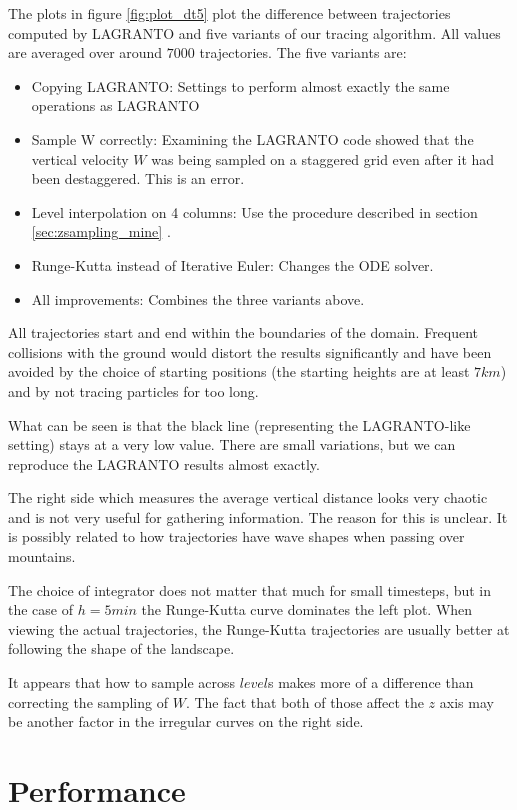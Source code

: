 The plots in figure \ref{fig:plot_dt5} plot the difference between trajectories computed by LAGRANTO and five variants of our tracing algorithm. All values are averaged over around $7000$ trajectories. The five variants are:
\begin{itemize}
\item Copying LAGRANTO: Settings to perform almost exactly the same operations as LAGRANTO
\item Sample W correctly: Examining the LAGRANTO code showed that the vertical velocity $W$ was being sampled on a staggered grid even after it had been destaggered. This is an error.
\item Level interpolation on 4 columns: Use the procedure described in section \ref{sec:zsampling_mine} .
\item Runge-Kutta instead of Iterative Euler: Changes the ODE solver.
\item All improvements: Combines the three variants above.
\end{itemize}

All trajectories start and end within the boundaries of the domain. Frequent collisions with the ground would distort the results significantly and have been avoided by the choice of starting positions (the starting heights are at least $7 km$) and by not tracing particles for too long.

What can be seen is that the black line (representing the LAGRANTO-like setting) stays at a very low value. There are small variations, but we can reproduce the LAGRANTO results almost exactly.

The right side which measures the average vertical distance looks very chaotic and is not very useful for gathering information. The reason for this is unclear. It is possibly related to how trajectories have wave shapes when passing over mountains.

The choice of integrator does not matter that much for small timesteps, but in the case of $h=5min$ the Runge-Kutta curve dominates the left plot. When viewing the actual trajectories, the Runge-Kutta trajectories are usually better at following the shape of the landscape.%

It appears that how to sample across $level$s makes more of a difference than correcting the sampling of $W$. The fact that both of those affect the $z$ axis may be another factor in the irregular curves on the right side.

\section{Performance}

